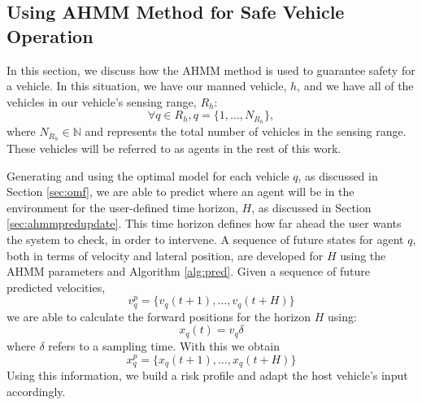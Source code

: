 \documentclass[letterpaper, 10 pt, conference]{ieeeconf}  %
\begin{document}


\subsection{Using AHMM Method for Safe Vehicle Operation}
In this section, we discuss how the AHMM method is used to guarantee safety for a vehicle. In this situation, we have our manned vehicle, $h$, and we have all of the vehicles in our vehicle's sensing range, $R_h$:
\begin{equation}
    \forall{q}\in R_h, q = \{1,\ldots,N_{R_h}\},
\end{equation}
where $N_{R_h}\in\mathbb{N}$ and represents the total number of vehicles in the sensing range. These vehicles will be referred to as agents in the rest of this work.

Generating and using the optimal model for each vehicle $q$, as discussed in Section \ref{sec:omf}, we are able to predict where an agent will be in the environment for the user-defined time horizon, $H$, as discussed in Section \ref{sec:ahmmpredupdate}. This time horizon defines how far ahead the user wants the system to check, in order to intervene. A sequence of future states for agent $q$, both in terms of velocity and lateral position, are developed for $H$ using the AHMM parameters and Algorithm \ref{alg:pred}. Given a sequence of future predicted velocities,
\begin{equation}
    v_q^p = \{v_q(t+1),\ldots,v_q(t+H)\}
\end{equation}
we are able to calculate the forward positions for the horizon $H$ using:
\begin{equation} \label{eq:dumpos}
    x_q(t) = v_q\delta
\end{equation}
where $\delta$ refers to a sampling time. With this we obtain
\begin{equation}
    x_q^p = \{x_q(t+1),\ldots,x_q(t+H)\}
\end{equation}
Using this information, we build a risk profile and adapt the host vehicle's input accordingly.
\end{document}
